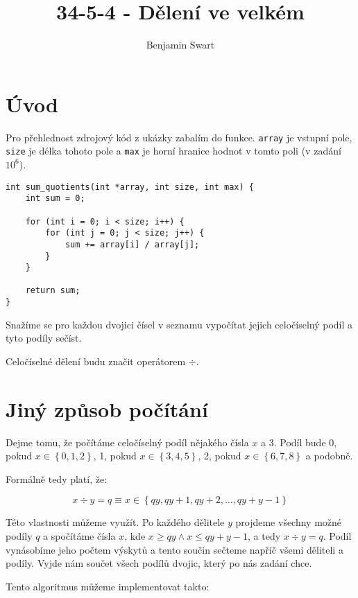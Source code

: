 \documentclass{article}
\title{34-5-4 - Dělení ve velkém}
\author{Benjamin Swart}
\begin{document}
\maketitle

\section{Úvod}

Pro přehlednost zdrojový kód z ukázky zabalím do funkce. \texttt{array} je vstupní pole, \texttt{size} je délka tohoto pole a \texttt{max} je horní hranice hodnot v tomto poli (v zadání \(10^6\)).

\begin{verbatim}
int sum_quotients(int *array, int size, int max) {
    int sum = 0;

    for (int i = 0; i < size; i++) {
        for (int j = 0; j < size; j++) {
            sum += array[i] / array[j];
        }
    }

    return sum;
}
\end{verbatim}

Snažíme se pro každou dvojici čísel v seznamu vypočítat jejich celočíselný podíl a tyto podíly sečíst.

Celočíselné dělení budu značit operátorem \(\div\).

\section{Jiný způsob počítání}

Dejme tomu, že počítáme celočíselný podíl nějakého čísla \(x\) a 3. Podíl bude 0, pokud \(x \in \left\{0, 1, 2\right\}\), 1, pokud \(x \in \left\{3, 4, 5\right\}\), 2, pokud \(x \in \left\{6, 7, 8\right\}\) a podobně.

Formálně tedy platí, že:

\begin{equation*}
    x \div y = q \equiv x \in \left\{qy, qy+1, qy+2, \dots, qy+y-1\right\}
\end{equation*}

Této vlastnosti můžeme využít. Po každého dělitele \(y\) projdeme všechny možné podíly \(q\) a spočítáme čísla \(x\), kde \(x \ge qy \land x \le qy + y - 1\), a tedy \(x \div y = q\). Podíl vynásobíme jeho počtem výskytů a tento součin sečteme napříč všemi děliteli a podíly. Vyjde nám součet všech podílů dvojic, který po nás zadání chce.

Tento algoritmus můžeme implementovat takto:
\end{document}
